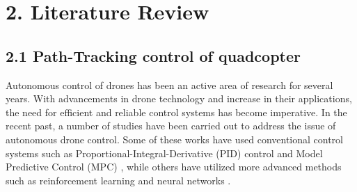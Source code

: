 \documentclass[
  journal=largetwo,
  manuscript=article-type,
  year=2023,
  volume=1,
]{iitp-journal}
\begin{document}




\section{2. Literature Review}
\subsection{2.1 Path-Tracking control of quadcopter}
Autonomous control of drones has been an active area of research for several years. With advancements in drone technology and increase in their applications, the need for efficient and reliable control systems has become imperative. In the recent past, a number of studies have been carried out to address the issue of autonomous drone control. Some of these works have used conventional control systems such as Proportional-Integral-Derivative (PID) control \cite{1} and Model Predictive Control (MPC) \cite{2}, while others have utilized more advanced methods such as reinforcement learning and neural networks \cite{3}.
\end{document}

